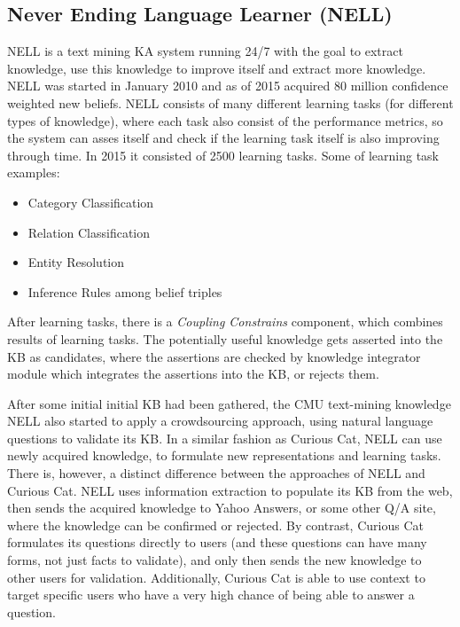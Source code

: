\subsection{Never Ending Language Learner (NELL)}
\label{section:r:nell}
NELL\parencite{Mitchell2015} is a text mining KA system running 24/7 with the
goal to extract knowledge, use this knowledge to improve itself and extract
more knowledge. NELL was started in January 2010 and as of 2015 acquired
80 million confidence weighted new beliefs. NELL consists of many different
learning tasks (for different types of knowledge), where each task also consist
of the performance metrics, so the system can asses itself and check if the 
learning task itself is also improving through time. In 2015 it consisted of
2500 learning tasks. Some of learning task examples:
\begin{itemize}
	\item Category Classification
	\item Relation Classification
	\item Entity Resolution
	\item Inference Rules among belief triples
\end{itemize}
After learning tasks, there is a \emph{Coupling Constrains} component, which
combines results of learning tasks. The potentially useful knowledge gets
asserted into the KB as candidates, where the assertions are checked by knowledge
integrator module which integrates the assertions into the KB, or rejects them.

After some initial initial KB had been gathered, the CMU text-mining knowledge 
NELL also started to apply a crowdsourcing approach\parencite{Pedro2012a},
using natural language questions to validate its KB. In a similar
fashion as Curious Cat, NELL can use newly acquired knowledge, to 
formulate new representations and learning tasks. There is, however, a 
distinct difference between the approaches of NELL and Curious Cat. 
NELL uses information extraction to populate its KB from the web, 
then sends the acquired knowledge to Yahoo Answers, or some other Q/A site, 
where the knowledge can be confirmed or rejected. 
By contrast, Curious Cat formulates its questions directly to users 
(and these questions can have many forms, not just facts to validate), 
and only then sends the new knowledge to other users for validation. 
Additionally, Curious Cat is able to use context to target specific users who 
have a very high chance of being able to answer a question.

